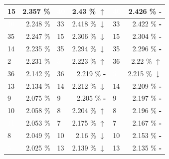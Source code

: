 \documentclass[letterpaper]{article}
\newcommand{\caseUp}[1][]{#1\textcolor[HTML]{008000}{$\mathbf{\uparrow}$}}
\newcommand{\caseStable}[1][]{#1\textcolor[HTML]{3779dd}{\textbf{-}}}
\newcommand{\caseDown}[1][]{#1\textcolor[HTML]{dd3737}{$\mathbf{\downarrow}$}}
\begin{document}
\begin{table}
\begin{tabular}{|l|r||l|r||l|r|}
	    \cellcolor[HTML]{FF69B4} 15 & 2.357 \% & \cellcolor[HTML]{483D8B} \textcolor{white}{40} & 2.43 \% \caseUp[\hfill] & \cellcolor[HTML]{483D8B} \textcolor{white}{40} & 2.426 \% \caseStable[\hfill] \\ \hline 
	    \cellcolor[HTML]{483D8B} \textcolor{white}{40} & 2.248 \% & \cellcolor[HTML]{2E8B57} 33 & 2.418 \% \caseDown[\hfill] & \cellcolor[HTML]{2E8B57} 33 & 2.422 \% \caseStable[\hfill] \\ \hline 
	    \cellcolor[HTML]{2E8B57} 35 & 2.247 \% & \cellcolor[HTML]{FF69B4} 15 & 2.306 \% \caseDown[\hfill] & \cellcolor[HTML]{FF69B4} 15 & 2.304 \% \caseStable[\hfill] \\ \hline 
	    \cellcolor[HTML]{FF69B4} 14 & 2.235 \% & \cellcolor[HTML]{2E8B57} 35 & 2.294 \% \caseDown[\hfill] & \cellcolor[HTML]{2E8B57} 35 & 2.296 \% \caseStable[\hfill] \\ \hline 
	    \cellcolor[HTML]{A0522D}  2 & 2.231 \% & \cellcolor[HTML]{8B1A1A} \textcolor{white}{5} & 2.223 \% \caseUp[\hfill] & \cellcolor[HTML]{E6E6FA} 36 & 2.22 \% \caseUp[\hfill] \\ \hline 
	    \cellcolor[HTML]{E6E6FA} 36 & 2.142 \% & \cellcolor[HTML]{E6E6FA} 36 & 2.219 \% \caseStable[\hfill] & \cellcolor[HTML]{8B1A1A} \textcolor{white}{5} & 2.215 \% \caseDown[\hfill] \\ \hline 
	    \cellcolor[HTML]{FFFFF0} 13 & 2.134 \% & \cellcolor[HTML]{FF69B4} 14 & 2.212 \% \caseDown[\hfill] & \cellcolor[HTML]{FF69B4} 14 & 2.209 \% \caseStable[\hfill] \\ \hline 
	    \cellcolor[HTML]{1E90FF}  9 & 2.075 \% & \cellcolor[HTML]{1E90FF}  9 & 2.205 \% \caseStable[\hfill] & \cellcolor[HTML]{1E90FF} 9 & 2.197 \% \caseStable[\hfill] \\ \hline 
	    \cellcolor[HTML]{1E90FF} 10 & 2.058 \% & \cellcolor[HTML]{FFC1C1}  8 & 2.204 \% \caseUp[\hfill] & \cellcolor[HTML]{FFC1C1} 8 & 2.196 \% \caseStable[\hfill] \\ \hline 
	    \cellcolor[HTML]{000000} \textcolor{white}{11} & 2.053 \% & \cellcolor[HTML]{1E90FF}  7 & 2.175 \% \caseUp[\hfill] & \cellcolor[HTML]{1E90FF} 7 & 2.167 \% \caseStable[\hfill] \\ \hline 
	    \cellcolor[HTML]{FFC1C1}  8 & 2.049 \% & \cellcolor[HTML]{1E90FF} 10 & 2.16 \% \caseDown[\hfill] & \cellcolor[HTML]{1E90FF} 10 & 2.153 \% \caseStable[\hfill] \\ \hline 
	    \cellcolor[HTML]{8B1A1A}  \textcolor{white}{5} & 2.025 \% & \cellcolor[HTML]{FFFFF0} 13 & 2.139 \% \caseDown[\hfill] & \cellcolor[HTML]{FFFFF0} 13 & 2.135 \% \caseStable[\hfill] \\ \hline 

\end{tabular}
\end{table}
\end{document}

